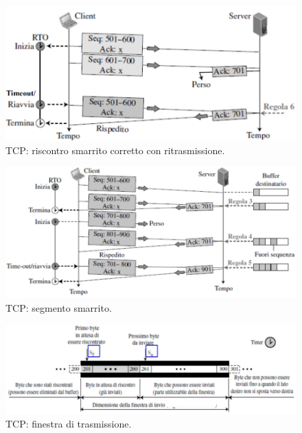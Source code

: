 \documentclass[11pt, italian, openany]{book}
\begin{document}
\begin{sloppypar}
\begin{figure}[!h]
	\centering
	\includegraphics[scale=0.4]{images/tcp-riscontro-smarrito-ritrasmissione.png}
	\caption{TCP: riscontro smarrito corretto con ritrasmissione.}
	\label{fig:tcp-riscontro-smarrito-ritrasmissione}
\end{figure}

\pagebreak

\begin{figure}[!h]
	\centering
	\includegraphics[scale=0.45]{images/tcp-segmento-smarrito.png}
	\caption{TCP: segmento smarrito.}
	\label{fig:tcp-segmento-smarrito}
\end{figure}

\begin{figure}[!h]
	\centering
	\includegraphics[scale=0.5]{images/tcp-finestra-di-trasmissione.png}
	\caption{TCP: finestra di trasmissione.}
	\label{fig:tcp-finestra-di-trasmissione}
\end{figure}


\end{sloppypar}
\end{document}
